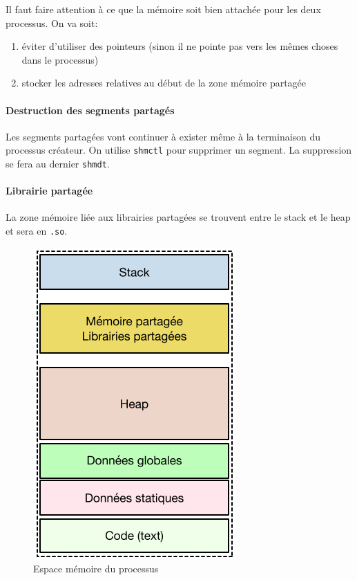 Il faut faire attention à ce que la mémoire soit bien attachée pour les
deux processus. On va soit:

\begin{enumerate}
\def\labelenumi{\arabic{enumi}.}
\tightlist
\item
  éviter d'utiliser des pointeurs (sinon il ne pointe pas vers les mêmes
  choses dans le processus)
\item
  stocker les adresses relatives au début de la zone mémoire partagée
\end{enumerate}

\paragraph{Destruction des segments
partagés}\label{destruction-des-segments-partaguxe9s}

Les segments partagées vont continuer à exister même à la terminaison du
processus créateur. On utilise \texttt{shmctl} pour supprimer un
segment. La suppression se fera au dernier \texttt{shmdt}.

\paragraph{Librairie partagée}\label{librairie-partaguxe9e}

La zone mémoire liée aux librairies partagées se trouvent entre le stack
et le heap et sera en \texttt{.so}.

\begin{figure}
\centering
\includegraphics{image-62.png}
\caption{Espace mémoire du processus}
\end{figure}

